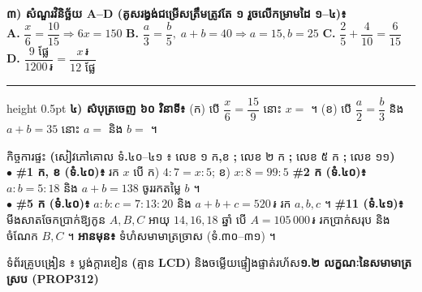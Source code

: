 \documentclass[a4paper,10pt]{article}
\newcommand{\en}[1]{{\TimesEn #1}}
\newcommand{\enbf}[1]{{\TimesEn\bfseries #1}}
\newcommand{\riel}{\,\text{៛}}
\newcommand{\dotline}[1][2.2cm]{\makebox[#1]{\dotfill}}
\newcommand{\pagebanner}[2]{%
  \begin{tcolorbox}[
    enhanced, sharp corners, colback=headgray, colframe=black,
    boxrule=1.05pt, boxsep=1pt, top=2.5pt, bottom=2.5pt, left=6pt, right=6pt,
    after skip=3.5pt
  ]
    {\muol\fontsize{9.0pt}{13.2pt}\selectfont #1}\hfill{\fontsize{8.0pt}{11.2pt}\selectfont\textbf{#2}}
  \end{tcolorbox}%
}
\begin{document}
\vspace{4.5pt}
\begin{tcolorbox}[
  enhanced, sharp corners, colback=panelgray, colframe=black,
  boxrule=0.85pt, boxsep=1.6pt, top=3.5pt, bottom=3.5pt, left=5.5pt, right=5.5pt
]
  \textbf{៣) សំណួរវិនិច្ឆ័យ \en{A--D} (គូសរង្វង់ជម្រើសត្រឹមត្រូវតែ ១ រួចលើកម្រាមដៃ ១--៤)៖}\\
  \textbf{\en{A.}} $\dfrac{x}{6}=\dfrac{10}{15} \Rightarrow 6x=150$ \quad
  \textbf{\en{B.}} $\dfrac{a}{3}=\dfrac{b}{5},\; a+b=40 \Rightarrow a=15, b=25$ \quad
  \textbf{\en{C.}} $\dfrac{2}{5}+\dfrac{4}{10}=\dfrac{6}{15}$ \quad
  \textbf{\en{D.}} $\dfrac{9\text{ ផ្លែ}}{1200\riel}=\dfrac{x\riel}{12\text{ ផ្លែ}}$\\[2.5pt]
  \hrule height 0.5pt
  \vspace{2.5pt}
  \textbf{៤) សំបុត្រចេញ ៦០ វិនាទី៖}
  (ក) បើ $\dfrac{x}{6} = \dfrac{15}{9}$ នោះ $x =$ \dotline[1.2cm] ។ \quad
  (ខ) បើ $\dfrac{a}{2} = \dfrac{b}{3}$ និង $a+b = 35$ នោះ $a =$ \dotline[1.2cm] និង $b =$ \dotline[1.2cm] ។
\end{tcolorbox}

\vfill

\begin{tcolorbox}[
  enhanced, sharp corners, colback=white, colframe=black,
  boxrule=1.0pt, boxsep=1.6pt, top=3pt, bottom=3pt, left=5.5pt, right=5.5pt
]
  {\muol\fontsize{8.7pt}{12.2pt}\selectfont កិច្ចការផ្ទះ \enbf{(}សៀវភៅគោល ទំ\enbf{.}៤០--៤១ ៖ លេខ ១ ក\enbf{,}ខ \enbf{;} លេខ ២ ក \enbf{;} លេខ ៥ ក \enbf{;} លេខ ១១\enbf{)}}\\[2.5pt]
  \fontsize{8.7pt}{12.4pt}\selectfont
  $\bullet$ \textbf{\#1 ក, ខ (ទំ.៤០)៖} រក $x$ បើ ក) $4:7 = x:5$;\; ខ) $x:8 = 99:5$ \quad \textbar{} \quad
  \textbf{\#2 ក (ទំ.៤០)៖} $a:b = 5:18$ និង $a+b = 138$ ចូររកតម្លៃ $b$ ។\\
  $\bullet$ \textbf{\#5 ក (ទំ.៤០)៖} $a:b:c = 7:13:20$ និង $a+b+c = 520\riel$ រក $a, b, c$ ។ \;
  \textbf{\#11 (ទំ.៤១)៖} មីងសាតចែកប្រាក់ឱ្យកូន $A, B, C$ អាយុ $14, 16, 18$ ឆ្នាំ បើ $A = 105\,000\riel$ រកប្រាក់សរុប និងចំណែក $B, C$ ។ \quad \textbf{អានមុន៖} ទំហំសមាមាត្រច្រាស (ទំ.៣០--៣១) ។
\end{tcolorbox}

\newpage

\pagebanner{ទំព័រគ្រូបង្រៀន ៖ ប្លង់ក្ដារខៀន \enbf{(}គ្មាន \enbf{LCD)} និងចម្លើយផ្ទៀងផ្ទាត់រហ័ស}{១.២ លក្ខណៈនៃសមាមាត្រស្រប \en{(PROP312)}}
\end{document}
